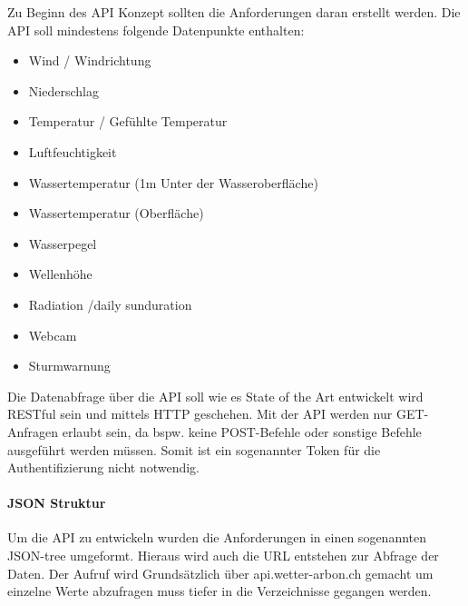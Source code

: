 Zu Beginn des API Konzept sollten die Anforderungen daran erstellt werden. Die API soll mindestens folgende Datenpunkte enthalten:
\begin{itemize}
\item Wind / Windrichtung
\item Niederschlag
\item Temperatur / Gefühlte Temperatur
\item Luftfeuchtigkeit
\item Wassertemperatur (1m Unter der Wasseroberfläche)
\item Wassertemperatur (Oberfläche)
\item Wasserpegel
\item Wellenhöhe
\item Radiation /daily sunduration
\item Webcam
\item Sturmwarnung
\end{itemize}
Die Datenabfrage über die API soll wie es State of the Art entwickelt wird RESTful sein und mittels HTTP geschehen. Mit der API werden nur GET-Anfragen erlaubt sein, da bspw. keine POST-Befehle oder sonstige Befehle ausgeführt werden müssen. Somit ist ein sogenannter Token für die Authentifizierung nicht notwendig. 

\paragraph{JSON Struktur}

Um die API zu entwickeln wurden die Anforderungen in einen sogenannten JSON-tree umgeformt. Hieraus wird auch die URL entstehen zur Abfrage der Daten. Der Aufruf wird Grundsätzlich über api.wetter-arbon.ch gemacht um einzelne Werte abzufragen muss tiefer in die Verzeichnisse gegangen werden.

